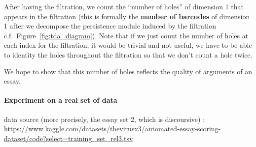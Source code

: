 After having the filtration, we count the ``number of holes'' of dimension 1
that appears in the filtration (this is formally the \textbf{number of
barcodes} of dimension 1 after we decompose the persistence module
induced by the filtration c.f.\ Figure~\ref{fig:tda_diagram}).
Note that if we just count the number of holes at each index for the filtration,
it would be trivial and not useful, we have to be able to identity the holes
throughout the filtration so that we don't count a hole twice.

We hope to show that this number of holes reflects the quality of arguments of an essay.

\paragraph{Experiment on a real set of data}

data source (more precisely, the essay set 2, which is discoursive) :
\url{https://www.kaggle.com/datasets/thevirusx3/automated-essay-scoring-dataset/code?select=training_set_rel3.tsv}

